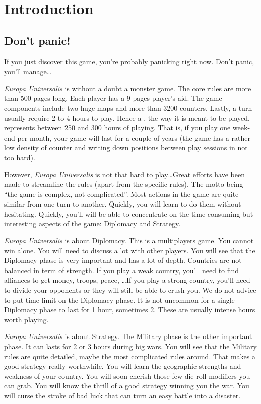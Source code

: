 
\chapter*{Introduction}

\section*{Don't panic!}
If you just discover this game, you're probably panicking right now. Don't
panic, you'll manage\ldots

\emph{Europa Universalis} is without a doubt a monster game. The core rules
are more than 500 pages long. Each player has a 9 pages player's aid. The game
components include two huge maps and more than 3200 counters. Lastly, a turn
usually require 2 to 4 hours to play. Hence a , the way
it is meant to be played, represents between 250 and 300 hours of
playing. That is, if you play one week-end per month, your game will last for
a couple of years (the game has a rather low density of counter and writing
down positions between play sessions in not too hard).

However, \emph{Europa Universalis} is not that hard to play\ldots Great
efforts have been made to streamline the rules (apart from the specific
rules). The motto being ``the game is complex, not complicated''. Most actions
in the game are quite similar from one turn to another. Quickly, you will learn
to do them without hesitating. Quickly, you'll will be able to concentrate on
the time-consuming but interesting aspects of the game: Diplomacy and
Strategy.

\emph{Europa Universalis} is about Diplomacy. This is a multiplayers game. You
cannot win alone. You will need to discuss a lot with other players. You will
see that the Diplomacy phase is very important and has a lot of
depth. Countries are not balanced in term of strength. If you play a weak
country, you'll need to find alliances to get money, troops, peace, \ldots If
you play a strong country, you'll need to divide your opponents or they will
still be able to crush you. We do not advice to put time limit on the
Diplomacy phase. It is not uncommon for a single Diplomacy phase to last for 1
hour, sometimes 2. These are usually intense hours worth playing.

\emph{Europa Universalis} is about Strategy. The Military phase is the other
important phase. It can lasts for 2 or 3 hours during big wars. You will see
that the Military rules are quite detailed, maybe the most complicated rules
around. That makes a good strategy really worthwhile. You will learn the
geographic strengths and weakness of your country. You will soon cherish those
few  die roll modifiers you can grab. You will know the thrill of a
good strategy winning you the war. You will curse the stroke of bad luck that
can turn an easy battle into a disaster.

